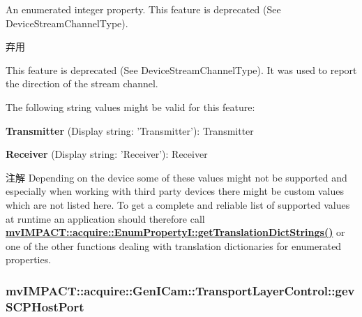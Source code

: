An enumerated integer property. This feature is deprecated (See Device\+Stream\+Channel\+Type). 

\begin{DoxyRefDesc}{弃用}
\item[\hyperlink{deprecated__deprecated000084}{弃用}]This feature is deprecated (See Device\+Stream\+Channel\+Type). It was used to report the direction of the stream channel.\end{DoxyRefDesc}


The following string values might be valid for this feature\+:
\begin{DoxyItemize}
\item {\bfseries Transmitter} (Display string\+: 'Transmitter')\+: Transmitter
\item {\bfseries Receiver} (Display string\+: 'Receiver')\+: Receiver
\end{DoxyItemize}

\begin{DoxyNote}{注解}
Depending on the device some of these values might not be supported and especially when working with third party devices there might be custom values which are not listed here. To get a complete and reliable list of supported values at runtime an application should therefore call {\bfseries \hyperlink{classmv_i_m_p_a_c_t_1_1acquire_1_1_enum_property_i_a0ba6ccbf5ee69784d5d0b537924d26b6}{mv\+I\+M\+P\+A\+C\+T\+::acquire\+::\+Enum\+Property\+I\+::get\+Translation\+Dict\+Strings()}} or one of the other functions dealing with translation dictionaries for enumerated properties. 
\end{DoxyNote}
\hypertarget{classmv_i_m_p_a_c_t_1_1acquire_1_1_gen_i_cam_1_1_transport_layer_control_af2fd412fe30ab9192ef3f097eaf015c5}{
\subsubsection[{gev\+S\+C\+P\+Host\+Port}]{ mv\+I\+M\+P\+A\+C\+T\+::acquire\+::\+Gen\+I\+Cam\+::\+Transport\+Layer\+Control\+::gev\+S\+C\+P\+Host\+Port}}\label{classmv_i_m_p_a_c_t_1_1acquire_1_1_gen_i_cam_1_1_transport_layer_control_af2fd412fe30ab9192ef3f097eaf015c5}


